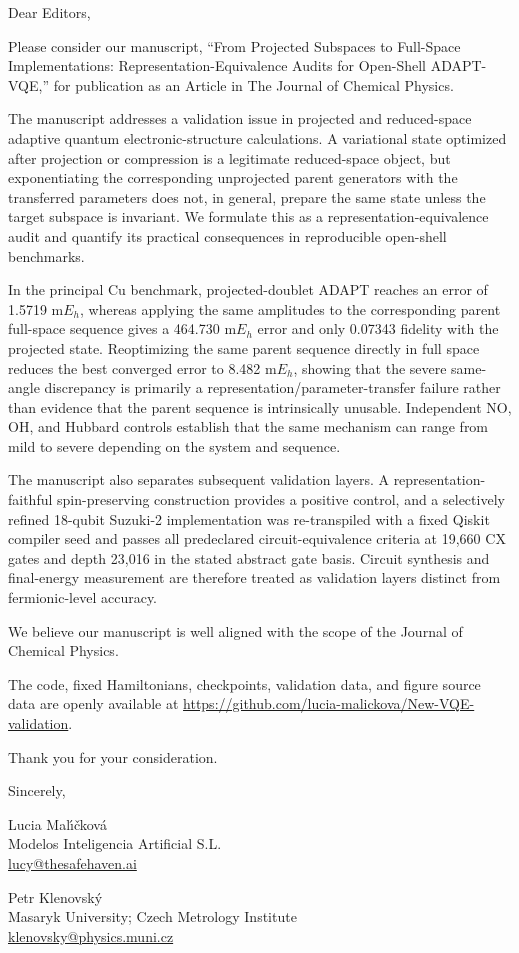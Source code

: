 \documentclass[11pt]{article}
\begin{document}
Dear Editors,

Please consider our manuscript, ``From Projected Subspaces to Full-Space Implementations: Representation-Equivalence Audits for Open-Shell ADAPT-VQE,'' for publication as an Article in The Journal of Chemical Physics.

The manuscript addresses a validation issue in projected and reduced-space adaptive quantum electronic-structure calculations. A variational state optimized after projection or compression is a legitimate reduced-space object, but exponentiating the corresponding unprojected parent generators with the transferred parameters does not, in general, prepare the same state unless the target subspace is invariant. We formulate this as a representation-equivalence audit and quantify its practical consequences in reproducible open-shell benchmarks.

In the principal Cu benchmark, projected-doublet ADAPT reaches an error of 1.5719 m$E_h$, whereas applying the same amplitudes to the corresponding parent full-space sequence gives a 464.730 m$E_h$ error and only 0.07343 fidelity with the projected state. Reoptimizing the same parent sequence directly in full space reduces the best converged error to 8.482 m$E_h$, showing that the severe same-angle discrepancy is primarily a representation/parameter-transfer failure rather than evidence that the parent sequence is intrinsically unusable. Independent NO, OH, and Hubbard controls establish that the same mechanism can range from mild to severe depending on the system and sequence.

The manuscript also separates subsequent validation layers. A representation-faithful spin-preserving construction provides a positive control, and a selectively refined 18-qubit Suzuki-2 implementation was re-transpiled with a fixed Qiskit compiler seed and passes all predeclared circuit-equivalence criteria at 19,660 CX gates and depth 23,016 in the stated abstract gate basis. Circuit synthesis and final-energy measurement are therefore treated as validation layers distinct from fermionic-level accuracy.

We believe our manuscript is well aligned with the scope of the Journal of Chemical Physics.

The code, fixed Hamiltonians, checkpoints, validation data, and figure source data are openly available at \url{https://github.com/lucia-malickova/New-VQE-validation}.

Thank you for your consideration.

Sincerely,

Lucia Mal\'{\i}\v{c}kov\'{a}\\
Modelos Inteligencia Artificial S.L.\\
\href{mailto:lucy@thesafehaven.ai}{lucy@thesafehaven.ai}

Petr Klenovsk\'{y}\\
Masaryk University; Czech Metrology Institute\\
\href{mailto:klenovsky@physics.muni.cz}{klenovsky@physics.muni.cz}
\end{document}
